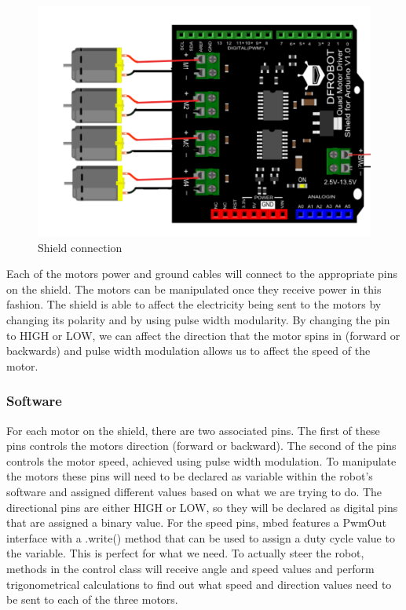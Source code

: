 				\begin{figure}[h]
					\centering
					\includegraphics[width=.7\linewidth]{SYNTHESIS/shield_connection.png}
					\caption{Shield connection}
					\label{fig:shieldsetup}
				\end{figure}
				
				Each of the motors power and ground cables will connect to the appropriate pins on the shield. The motors can be manipulated once they receive power in this fashion. The shield is able to affect the electricity being sent to the motors by changing its polarity and by using pulse width modularity. By changing the pin to HIGH or LOW, we can affect the direction that the motor spins in (forward or backwards) and pulse width modulation allows us to affect the speed of the motor.
				
				\subsubsection{Software}
				For each motor on the shield, there are two associated pins. The first of these pins controls the motors direction (forward or backward). The second of the pins controls the motor speed,  achieved using pulse width modulation. To manipulate the motors these pins will need to be declared as variable within the robot's software and assigned different values based on what we are trying to do. The directional pins are either HIGH or LOW, so they will be declared as digital pins that are assigned a binary value. For the speed pins, mbed features a PwmOut interface with a .write() method that can be used to assign a duty cycle value to the variable. This is perfect for what we need. To actually steer the robot, methods in the control class will receive angle and speed values and perform trigonometrical calculations to find out what speed and direction values need to be sent to each of the three motors.
				
